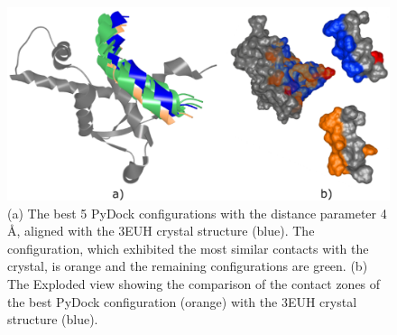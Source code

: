 \documentclass{bmcart}
\def\ExpView {Exploded view\xspace}
\begin{document}
\begin{backmatter}
\begin{figure}[h!]
    \centering 
    \includegraphics[width=0.9\columnwidth]{images/figure19.pdf}
    \caption{(a) The best 5 PyDock configurations with the distance parameter 4 \AA,  aligned with the 3EUH crystal structure (blue). The configuration, which exhibited the most similar contacts with the crystal, is orange and the remaining configurations are green. (b) The \ExpView showing the comparison of the contact zones of the best PyDock configuration (orange) with the 3EUH crystal structure (blue).}
  \label{fig:pydock_pocket_string}
\end{figure}










\end{backmatter}
\end{document}
